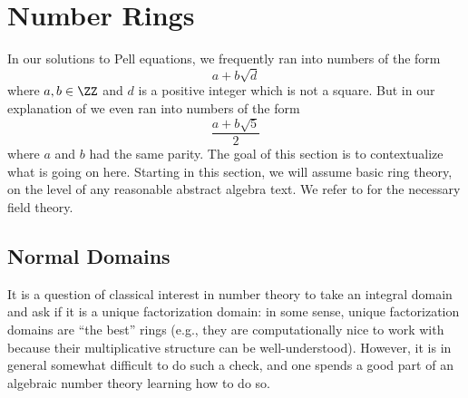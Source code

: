 \documentclass[../notes.tex]{subfiles}
\begin{document}
\section{Number Rings}

In our solutions to Pell equations, we frequently ran into numbers of the form
\[a+b\sqrt d\]
where $a,b\in\ZZ$ and $d$ is a positive integer which is not a square. But in our explanation of  we even ran into numbers of the form
\[\frac{a+b\sqrt 5}2\]
where $a$ and $b$ had the same parity. The goal of this section is to contextualize what is going on here. Starting in this section, we will assume basic ring theory, on the level of any reasonable abstract algebra text. We refer to  for the necessary field theory.


\subsection{Normal Domains}
It is a question of classical interest in number theory to take an integral domain and ask if it is a unique factorization domain: in some sense, unique factorization domains are ``the best'' rings (e.g., they are computationally nice to work with because their multiplicative structure can be well-understood). However, it is in general somewhat difficult to do such a check, and one spends a good part of an algebraic number theory learning how to do so.
\end{document}
